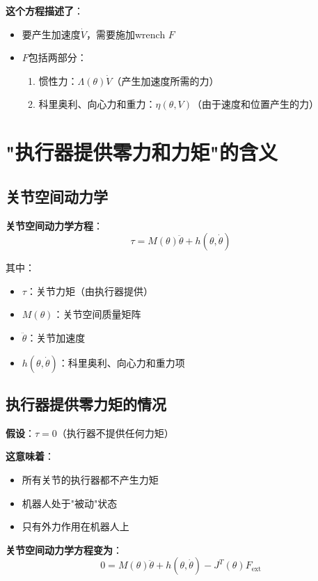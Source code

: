 \documentclass[12pt,a4paper]{article}
\begin{document}
\textbf{这个方程描述了}：
\begin{itemize}
\item 要产生加速度$\dot{V}$，需要施加wrench $F$
\item $F$包括两部分：
\begin{enumerate}
\item 惯性力：$\Lambda(\theta)\dot{V}$（产生加速度所需的力）
\item 科里奥利、向心力和重力：$\eta(\theta, V)$（由于速度和位置产生的力）
\end{enumerate}
\end{itemize}

\section{"执行器提供零力和力矩"的含义}

\subsection{关节空间动力学}

\textbf{关节空间动力学方程}：
\begin{equation}
\tau = M(\theta)\ddot{\theta} + h(\theta, \dot{\theta}) \tag{8.82}
\end{equation}

其中：
\begin{itemize}
\item $\tau$：关节力矩（由执行器提供）
\item $M(\theta)$：关节空间质量矩阵
\item $\ddot{\theta}$：关节加速度
\item $h(\theta, \dot{\theta})$：科里奥利、向心力和重力项
\end{itemize}

\subsection{执行器提供零力矩的情况}

\textbf{假设}：$\tau = 0$（执行器不提供任何力矩）

\textbf{这意味着}：
\begin{itemize}
\item 所有关节的执行器都不产生力矩
\item 机器人处于"被动"状态
\item 只有外力作用在机器人上
\end{itemize}

\textbf{关节空间动力学方程变为}：
\begin{equation}
0 = M(\theta)\ddot{\theta} + h(\theta, \dot{\theta}) - J^T(\theta)F_{\text{ext}}
\end{equation}
\end{document}
